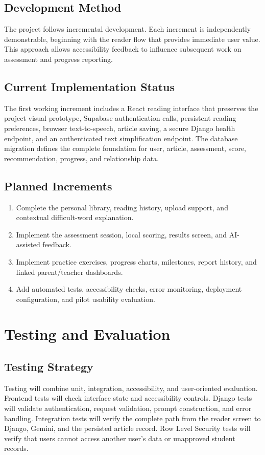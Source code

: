 \documentclass[a4paper]{tietreport}
\begin{document}
\section{Development Method}
The project follows incremental development. Each increment is independently demonstrable, beginning with the reader flow that provides immediate user value. This approach allows accessibility feedback to influence subsequent work on assessment and progress reporting.

\section{Current Implementation Status}
The first working increment includes a React reading interface that preserves the project visual prototype, Supabase authentication calls, persistent reading preferences, browser text-to-speech, article saving, a secure Django health endpoint, and an authenticated text simplification endpoint. The database migration defines the complete foundation for user, article, assessment, score, recommendation, progress, and relationship data.

\section{Planned Increments}
\begin{enumerate}
  \item Complete the personal library, reading history, upload support, and contextual difficult-word explanation.
  \item Implement the assessment session, local scoring, results screen, and AI-assisted feedback.
  \item Implement practice exercises, progress charts, milestones, report history, and linked parent/teacher dashboards.
  \item Add automated tests, accessibility checks, error monitoring, deployment configuration, and pilot usability evaluation.
\end{enumerate}

\chapter{Testing and Evaluation}
\section{Testing Strategy}
Testing will combine unit, integration, accessibility, and user-oriented evaluation. Frontend tests will check interface state and accessibility controls. Django tests will validate authentication, request validation, prompt construction, and error handling. Integration tests will verify the complete path from the reader screen to Django, Gemini, and the persisted article record. Row Level Security tests will verify that users cannot access another user's data or unapproved student records.
\end{document}
